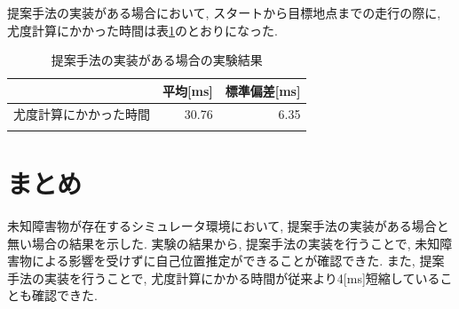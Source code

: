 提案手法の実装がある場合において, スタートから目標地点までの走行の際に, 
尤度計算にかかった時間は表\ref{tabule:likelihood_calc_time_sim_imp}のとおりになった. 

\begin{table}[ht]
  \begin{center}
    \caption{提案手法の実装がある場合の実験結果}
    \label{tabule:likelihood_calc_time_sim_imp}
    \begin{tabular}{l|r|r} 
      \thline
      & 平均[ms] &  標準偏差[ms] \\
      \hline
      尤度計算にかかった時間 & 30.76 & 6.35 \\
      \thline
    \end{tabular}
  \end{center}
\end{table}

\section{まとめ}
未知障害物が存在するシミュレータ環境において, 提案手法の実装がある場合と無い場合の結果を示した. 
実験の結果から, 提案手法の実装を行うことで, 未知障害物による影響を受けずに自己位置推定ができることが確認できた. 
また, 提案手法の実装を行うことで, 尤度計算にかかる時間が従来より4[ms]短縮していることも確認できた. 